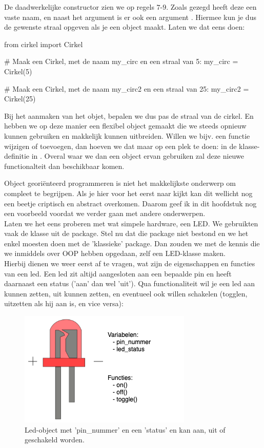 De daadwerkelijke constructor zien we op regels $7$-$9$. Zoals gezegd heeft deze een vaste naam, en naast het argument  is er ook een argument . Hiermee kun je dus de gewenste straal opgeven als je een object maakt. Laten we dat eens doen:

\begin{python}
from cirkel import Cirkel

# Maak een Cirkel, met de naam my_circ en een straal van 5:
my_circ  = Cirkel(5)   

# Maak een Cirkel, met de naam my_circ2 en een straal van 25:
my_circ2 = Cirkel(25) 
\end{python}

Bij het aanmaken van het objet, bepalen we dus pas de straal van de cirkel. En hebben we op deze manier een flexibel object gemaakt die we steeds opnieuw kunnen gebruiken en makkelijk kunnen uitbreiden. Willen we bijv. een functie wijzigen of toevoegen, dan hoeven we dat maar op een plek te doen: in de klasse-definitie in . Overal waar we dan een object ervan gebruiken zal deze nieuwe functionalteit dan beschikbaar komen. 

\newpage

Object georiënteerd programmeren is niet het makkelijkste onderwerp om compleet te begrijpen. Als je hier voor het eerst naar kijkt kan dit wellicht nog een beetje criptisch en abstract overkomen. Daarom geef ik in dit hoofdstuk nog een voorbeeld voordat we verder gaan met andere onderwerpen. \\

Laten we het eens proberen met wat simpele hardware, een LED. We gebruikten vaak de  klasse uit de  package. Stel nu dat die package niet bestond en we het enkel moesten doen met de 'klassieke'  package. Dan zouden we met de kennis die we inmiddels over OOP hebben opgedaan, zelf een LED-klasse maken. \\

Hierbij dienen we weer eerst af te vragen, wat zijn de eigenschappen en functies van een led. Een led zit altijd aangesloten aan een bepaalde pin en heeft daarnaast een status ('aan' dan wel 'uit'). Qua functionaliteit wil je een led aan kunnen zetten, uit kunnen zetten, en eventueel ook willen schakelen (togglen, uitzetten als hij aan is, en vice versa): 

\begin{figure}[h!]
\centering\includegraphics[scale=0.5]{Pictures/chapter07/led.png}
\caption{Led-object met 'pin\_nummer' en een 'status' en kan aan, uit of geschakeld worden.}
\label{fig:led} %
\end{figure}

